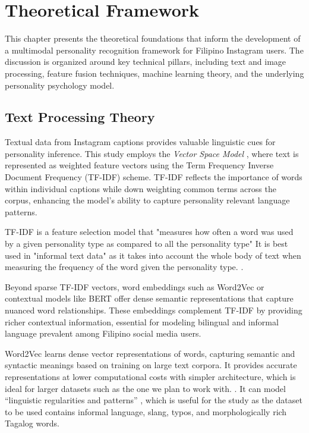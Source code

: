 %
%
%                 

\chapter{Theoretical Framework}
\label{sec:theoframework}

This chapter presents the theoretical foundations that inform the development of a multimodal personality recognition framework for Filipino Instagram users. The discussion is organized around key technical pillars, including text and image processing, feature fusion techniques, machine learning theory, and the underlying personality psychology model.

\section{Text Processing Theory}

Textual data from Instagram captions provides valuable linguistic cues for personality inference. This study employs the \textit{Vector Space Model} \citep{salton1975}, where text is represented as weighted feature vectors using the Term Frequency Inverse Document Frequency (TF-IDF) scheme. TF-IDF reflects the importance of words within individual captions while down weighting common terms across the corpus, enhancing the model's ability to capture personality relevant language patterns.


TF-IDF is a feature selection model that "measures how often a word was used by a given personality type as compared to all the personality type" It is best used in "informal text data" as it takes into account the whole body of text when measuring the frequency of the word given the personality type. \citep{Pradhan_Bhansali_Chandnani_Pangaonkar_2020}.

Beyond sparse TF-IDF vectors, word embeddings such as Word2Vec or contextual models like BERT offer dense semantic representations that capture nuanced word relationships. These embeddings complement TF-IDF by providing richer contextual information, essential for modeling bilingual and informal language prevalent among Filipino social media users.

Word2Vec learns dense vector representations of words, capturing semantic and syntactic meanings based on training on large text corpora. It provides accurate representations at lower computational costs with simpler architecture, which is ideal for larger datasets such as the one we plan to work with.  \citep{Ma_Zhang_2015}. It can model “linguistic regularities and patterns” \citep{Mikolov_Sutskever_Chen_Corrado_Dean_2013}, which is useful for the study as the dataset to be used contains informal language, slang, typos, and morphologically rich Tagalog words. 


